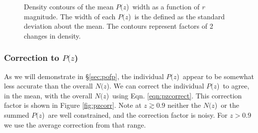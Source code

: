 \documentclass[preprint]{aastex}
\newcommand{\pofz}{$P(z$)}
\newcommand{\nofz}{$N(z$)}
\begin{document}
\begin{figure}[p]\centering
    \caption{Density contours of the mean \pofz\ width as a function of {\it r} magnitude. 
The width of each \pofz\ is the defined as the standard deviation about the mean. 
The contours represent factors of 2 changes in density.}
    \label{fig:pzwidth}
    \vspace{2em}
\end{figure}

\subsubsection{Correction to \pofz} \label{sec:pzcorr}

As we will demonstrate in \S \ref{sec:pofp}, the individual \pofz\ appear to be
somewhat less accurate than the overall \nofz.  We can correct the individual
\pofz\ to agree, in the mean, with the overall \nofz\ using Eqn.
\ref{eqn:pzcorrect}.  This correction factor is shown in Figure
\ref{fig:pzcorr}.  Note at $z \gtrsim 0.9$ neither the \nofz\ or the summed
\pofz\ are well constrained, and the correction factor is noisy.  For $z > 0.9$
we use the average correction from that range.
\end{document}
